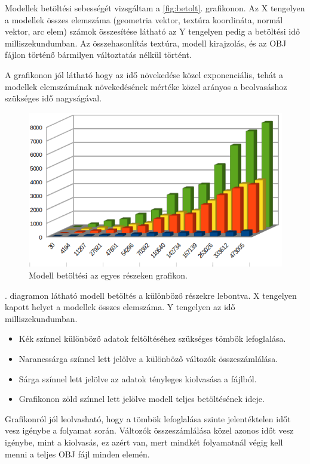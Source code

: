 Modellek betöltési sebességét vizsgáltam a  \ref{fig:betolt}. grafikonon. Az X tengelyen a modellek összes elemszáma (geometria vektor, textúra koordináta, normál vektor, arc elem) számok összesítése látható az Y tengelyen pedig a betöltési idő milliszekundumban. Az összehasonlítás textúra, modell kirajzolás, és az OBJ fájlon történő bármilyen változtatás nélkül történt.

A grafikonon jól látható hogy az idő növekedése közel exponenciális, tehát a modellek elemszámának növekedésének mértéke közel  arányos a beolvasáshoz szükséges idő nagyságával.
\bigskip
{}
\bigskip
\begin{figure}[h]
\centering
\includegraphics[width=\textwidth]{images/betoltesiido2.png}
\caption{Modell betöltési az egyes részeken grafikon.}
\label{fig:betolt2}
\end{figure}
\bigskip
{}. diagramon látható modell betöltés a különböző részekre lebontva. X tengelyen kapott helyet a modellek összes elemszáma. Y tengelyen az idő milliszekundumban.
\begin{itemize}
\item Kék színnel különböző adatok feltöltéséhez szükséges tömbök lefoglalása.

\item Narancssárga színnel lett jelölve a különböző változók összeszámlálása.

\item Sárga színnel lett jelölve az adatok tényleges kiolvasása a fájlból.

\item Grafikonon zöld színnel lett jelölve modell teljes betöltésének ideje.
 \end{itemize}
\bigskip
\noindent Grafikonról  jól leolvasható, hogy a tömbök lefoglalása szinte jelentéktelen időt vesz igénybe a folyamat során. Változók összeszámlálása közel azonos időt vesz igénybe, mint a kiolvasás, ez azért van, mert mindkét folyamatnál végig kell menni a teljes OBJ fájl minden elemén. 